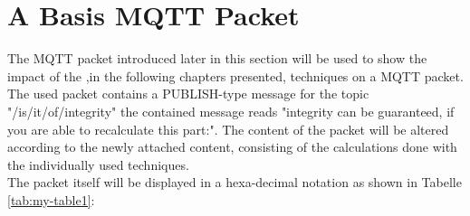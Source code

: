 \section{A Basis MQTT Packet}

The MQTT packet introduced later in this section will be used to show the impact of the ,in the following chapters presented, techniques on a MQTT packet.
The used packet contains a PUBLISH-type message for the topic "/is/it/of/integrity" the contained message reads "integrity can be guaranteed, if you are able to recalculate this part:".
The content of the packet will be altered according to the newly attached content, consisting of the calculations done with the individually used techniques. \\
\newpage
The packet itself will be displayed in a hexa-decimal notation as shown in Tabelle \ref{tab:my-table1}: \\

